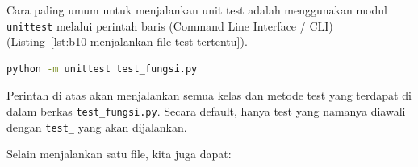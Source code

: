 Cara paling umum untuk menjalankan unit test adalah menggunakan modul \texttt{unittest} melalui perintah baris (Command Line Interface / CLI) (Listing~\ref{lst:b10-menjalankan-file-test-tertentu}).

\begin{lstlisting}[language=bash, caption={Menjalankan file test tertentu}, label={lst:b10-menjalankan-file-test-tertentu}]
python -m unittest test_fungsi.py
\end{lstlisting}

Perintah di atas akan menjalankan semua kelas dan metode test yang terdapat di dalam berkas \texttt{test\_fungsi.py}.  
Secara default, hanya test yang namanya diawali dengan \texttt{test\_} yang akan dijalankan.

Selain menjalankan satu file, kita juga dapat:

